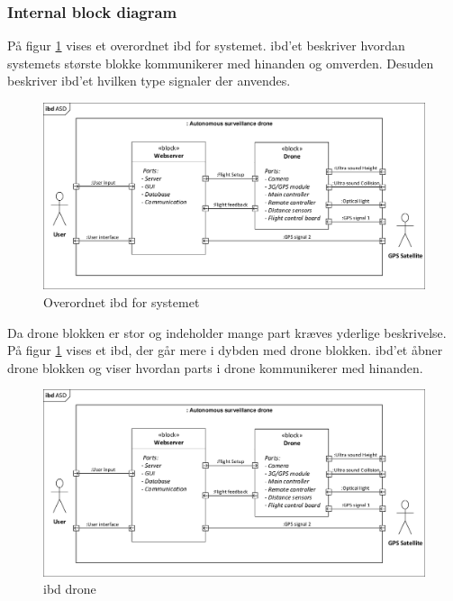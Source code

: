 \newpage

\subsubsection*{Internal block diagram}
\vspace{-0.3cm}	

På figur \ref{fig:ibd_asd} vises et overordnet ibd for systemet. ibd'et beskriver hvordan systemets største blokke kommunikerer med hinanden og omverden. Desuden beskriver ibd'et hvilken type signaler der anvendes. 

\begin{figure}[H]
	\centering
	\includegraphics[width=1\textwidth]{Billeder/Projektbeskrivelse/ibd1_overordnet.pdf}
	\caption{Overordnet ibd for systemet}
	\label{fig:ibd_asd}
\end{figure}

Da drone blokken er stor og indeholder mange part kræves yderlige beskrivelse. På figur \ref{fig:ibd_asd} vises et ibd, der går mere i dybden med drone blokken. ibd'et åbner drone blokken og viser hvordan parts i drone kommunikerer med hinanden. 

\begin{figure}[H]
	\centering
	\includegraphics[width=1\textwidth]{Billeder/Projektbeskrivelse/ibd1_overordnet.pdf}
	\caption{ibd drone}
	\label{fig:ibd_drone}
\end{figure}


